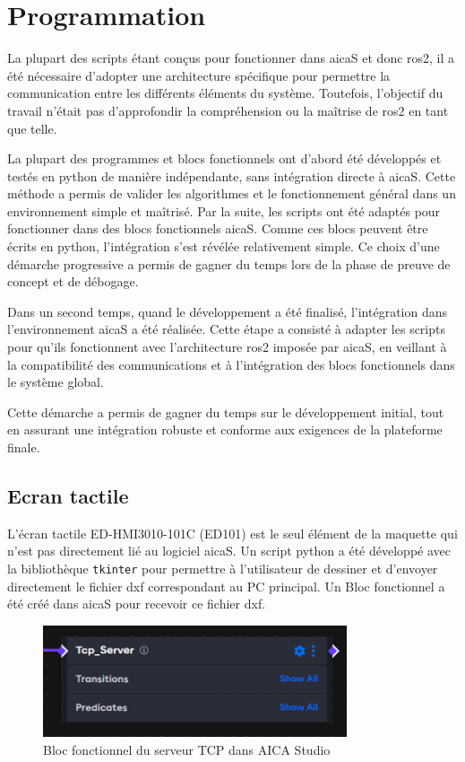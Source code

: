 \chapter{Programmation}
\label{chap:programmation}

La plupart des scripts étant conçus pour fonctionner dans \gls{aicaS} et donc \gls{ros2}, il a été nécessaire d'adopter une architecture spécifique pour permettre la communication entre les différents éléments du système. Toutefois, l'objectif du travail n'était pas d'approfondir la compréhension ou la maîtrise de \gls{ros2} en tant que telle.

La plupart des programmes et blocs fonctionnels ont d'abord été développés et testés en \gls{python} de manière indépendante, sans intégration directe à \gls{aicaS}. Cette méthode a permis de valider les algorithmes et le fonctionnement général dans un environnement simple et maîtrisé. Par la suite, les scripts ont été adaptés pour fonctionner dans des blocs fonctionnels \gls{aicaS}. Comme ces blocs peuvent être écrits en \gls{python}, l'intégration s'est révélée relativement simple. Ce choix d'une démarche progressive a permis de gagner du temps lors de la phase de preuve de concept et de débogage.

Dans un second temps, quand le développement a été finalisé, l'intégration dans l'environnement \gls{aicaS} a été réalisée. Cette étape a consisté à adapter les scripts pour qu'ils fonctionnent avec l'architecture \gls{ros2} imposée par \gls{aicaS}, en veillant à la compatibilité des communications et à l'intégration des blocs fonctionnels dans le système global.

Cette démarche a permis de gagner du temps sur le développement initial, tout en assurant une intégration robuste et conforme aux exigences de la plateforme finale.

\clearpage
\section{Ecran tactile}
L'écran tactile \gls{ED-HMI3010-101C} (ED101) est le seul élément de la maquette qui n'est pas directement lié au logiciel \gls{aicaS}. Un script \gls{python} a été développé avec la bibliothèque \texttt{tkinter} pour permettre à l'utilisateur de dessiner et d'envoyer directement le fichier \gls{dxf} correspondant au PC principal. Un Bloc fonctionnel a été créé dans \gls{aicaS} pour recevoir ce fichier \gls{dxf}.

\begin{figure}[H]
    \centering
    \includegraphics[width=0.8\textwidth]{assets/figures/AICA_Tcp_Server.png}
    \caption{Bloc fonctionnel du serveur TCP dans AICA Studio}
    \label{fig:touchscreen_interface}
\end{figure}

